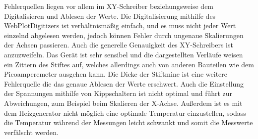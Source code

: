 Fehlerquellen liegen vor allem im XY-Schreiber beziehungsweise dem Digitalisieren und Ablesen der Werte.
Die Digitalisierung mithilfe des WebPlotDigitizers ist verhältnismäßig einfach, und es muss nicht jeder Wert einzelnd abgelesen werden, 
jedoch können Fehler durch ungenaue Skalierungen der Achsen passieren.
Auch die generelle Genauigkeit des XY-Schreibers ist anzuzweifeln. Das Gerät ist sehr sensibel und die dargestellten Verläufe weisen
ein Zittern des Stiftes auf, welches allerdings auch von anderen Bauteilen wie dem Picoamperemeter ausgehen kann.
Die Dicke der Stiftmine ist eine weitere Fehlerquelle die das genaue Ablesen der Werte erschwert.
Auch die Einstellung der Spannungen mithilfe von Kippschaltern ist nicht optimal und führt zur Abweichungen, zum Beispiel beim Skalieren der
X-Achse.
Außerdem ist es mit dem Heizgenerator nicht möglich eine optimale Temperatur einzustellen, sodass die Temperatur während der Messungen 
leicht schwankt und somit die Messwerte verfälscht werden.
\pagebreak



